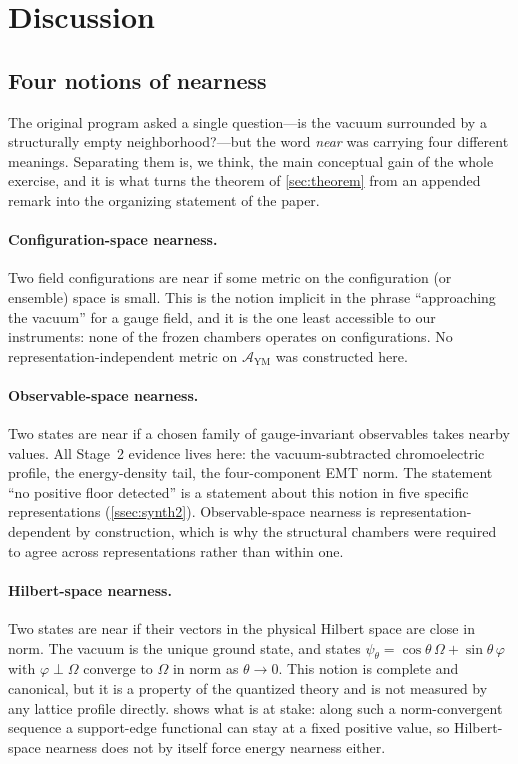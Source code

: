 \documentclass[11pt,a4paper]{article}
\theoremstyle{definition}
\theoremstyle{remark}
\newcommand{\AYM}{\mathcal{A}_{\mathrm{YM}}}
\begin{document}
\section{Discussion}\label{sec:discussion}

\subsection{Four notions of nearness}\label{ssec:four}
The original program asked a single question---is the vacuum surrounded by a structurally empty neighborhood?---but the word \emph{near} was carrying four different meanings. Separating them is, we think, the main conceptual gain of the whole exercise, and it is what turns the theorem of \cref{sec:theorem} from an appended remark into the organizing statement of the paper.

\paragraph{Configuration-space nearness.} Two field configurations are near if some metric on the configuration (or ensemble) space is small. This is the notion implicit in the phrase ``approaching the vacuum'' for a gauge field, and it is the one least accessible to our instruments: none of the frozen chambers operates on configurations. No representation-independent metric on $\AYM$ was constructed here.

\paragraph{Observable-space nearness.} Two states are near if a chosen family of gauge-invariant observables takes nearby values. All Stage~2 evidence lives here: the vacuum-subtracted chromoelectric profile, the energy-density tail, the four-component EMT norm. The statement ``no positive floor detected'' is a statement about this notion in five specific representations (\cref{ssec:synth2}). Observable-space nearness is representation-dependent by construction, which is why the structural chambers were required to agree across representations rather than within one.

\paragraph{Hilbert-space nearness.} Two states are near if their vectors in the physical Hilbert space are close in norm. The vacuum is the unique ground state, and states $\psi_\theta=\cos\theta\,\Omega+\sin\theta\,\varphi$ with $\varphi\perp\Omega$ converge to $\Omega$ in norm as $\theta\to0$. This notion is complete and canonical, but it is a property of the quantized theory and is not measured by any lattice profile directly.  shows what is at stake: along such a norm-convergent sequence a support-edge functional can stay at a fixed positive value, so Hilbert-space nearness does not by itself force energy nearness either.
\end{document}
